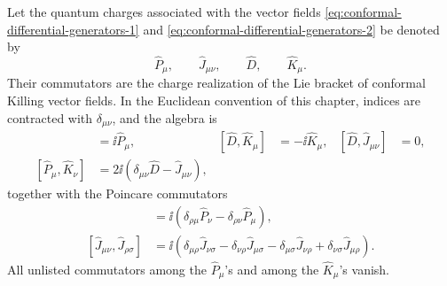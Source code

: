 \begin{lemma}
\label{lem:euclidean-conformal-charge-algebra}
Let the quantum charges associated with the vector fields
\eqref{eq:conformal-differential-generators-1} and
\eqref{eq:conformal-differential-generators-2} be denoted by
\[
  \widehat P_\mu,\qquad
  \widehat J_{\mu\nu},\qquad
  \widehat D,\qquad
  \widehat K_\mu .
\]
Their commutators are the charge realization of the Lie bracket of conformal
Killing vector fields.  In the Euclidean convention of this chapter, indices
are contracted with \(\delta_{\mu\nu}\), and the algebra is
\begin{align}
  [\widehat D,\widehat P_\mu]&=\ii\widehat P_\mu,
  &
  [\widehat D,\widehat K_\mu]&=-\ii\widehat K_\mu,
  &
  [\widehat D,\widehat J_{\mu\nu}]&=0,
  \label{eq:conf-alg-dilatation}\\
  [\widehat P_\mu,\widehat K_\nu]
  &=
  2\ii(\delta_{\mu\nu}\widehat D-\widehat J_{\mu\nu}),
  \label{eq:conf-alg-pk}
\end{align}
together with the Poincare commutators
\begin{align}
  [\widehat J_{\mu\nu},\widehat P_\rho]
  &=
  \ii(\delta_{\rho\mu}\widehat P_\nu-\delta_{\rho\nu}\widehat P_\mu),
  \\
  [\widehat J_{\mu\nu},\widehat J_{\rho\sigma}]
  &=
  \ii(
  \delta_{\mu\rho}\widehat J_{\nu\sigma}
  -\delta_{\nu\rho}\widehat J_{\mu\sigma}
  -\delta_{\mu\sigma}\widehat J_{\nu\rho}
  +\delta_{\nu\sigma}\widehat J_{\mu\rho}).
\end{align}
All unlisted commutators among the \(\widehat P_\mu\)'s and among the
\(\widehat K_\mu\)'s vanish.
\end{lemma}


